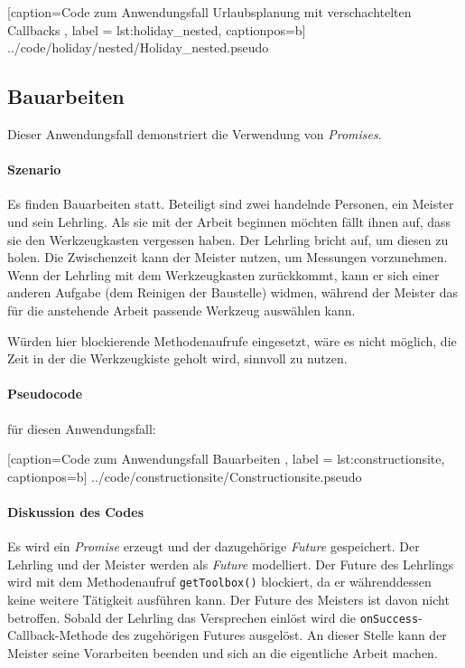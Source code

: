 
    [caption={Code zum Anwendungsfall \glqq Urlaubsplanung\grqq{} mit verschachtelten Callbacks },
       label = lst:holiday_nested,
       captionpos=b]
 {../code/holiday/nested/Holiday_nested.pseudo}

\subsection{Bauarbeiten}

Dieser Anwendungsfall demonstriert die Verwendung von \emph{Promises}.

\paragraph{Szenario}

Es finden Bauarbeiten statt. Beteiligt sind zwei handelnde Personen,
ein Meister und sein Lehrling. Als sie mit der Arbeit beginnen möchten
fällt ihnen auf, dass sie den Werkzeugkasten vergessen haben. Der
Lehrling bricht auf, um diesen zu holen. Die Zwischenzeit kann
der Meister nutzen, um Messungen vorzunehmen. Wenn der Lehrling mit
dem Werkzeugkasten zurückkommt, kann er sich einer anderen Aufgabe
(dem Reinigen der Baustelle) widmen, während der Meister das für die
anstehende Arbeit passende Werkzeug auswählen kann.

Würden hier blockierende Methodenaufrufe eingesetzt, wäre es nicht
möglich, die Zeit in der die Werkzeugkiste geholt wird, sinnvoll zu
nutzen.

\paragraph{Pseudocode} für diesen Anwendungsfall:


    [caption={Code zum Anwendungsfall \glqq Bauarbeiten\grqq{} },
       label = lst:constructionsite,
       captionpos=b]
 {../code/constructionsite/Constructionsite.pseudo}

\paragraph{Diskussion des Codes}

Es wird ein \emph{Promise} erzeugt und der dazugehörige \emph{Future}
gespeichert. Der Lehrling und der Meister werden als \emph{Future}
modelliert. Der Future des Lehrlings wird mit dem Methodenaufruf
\texttt{getToolbox()} blockiert, da er währenddessen keine weitere
Tätigkeit ausführen kann. Der Future des Meisters ist davon nicht
betroffen. Sobald der Lehrling das Versprechen einlöst wird die
\texttt{onSuccess}-Callback-Methode des zugehörigen Futures ausgelöst.
An dieser Stelle kann der Meister seine Vorarbeiten beenden und sich
an die eigentliche Arbeit machen.

